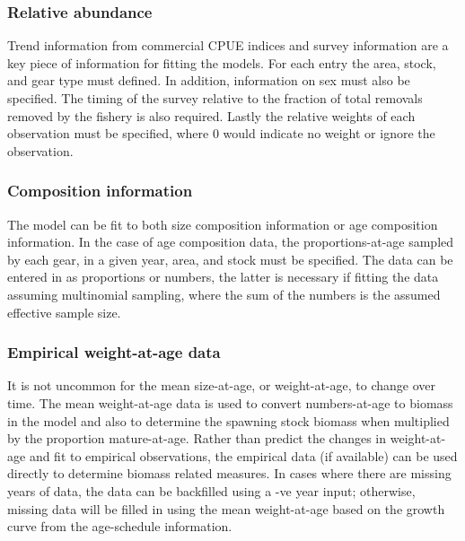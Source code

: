     \subsubsection{Relative abundance} %
    \label{ssub:relative_abundance}
        Trend information from commercial CPUE indices and survey information are a key piece of information for fitting the models.  For each entry the area, stock, and gear type must defined. In addition, information on sex must also be specified.  The timing of the survey relative to the fraction of total removals removed by the fishery is also required.  Lastly the relative weights of each observation must be specified, where 0 would indicate no weight or ignore the observation.
    \subsubsection{Composition information} %
    \label{ssub:composition_information}
        The model can be fit to both size composition information or age composition information.  In the case of age composition data, the proportions-at-age sampled by each gear, in a given year, area, and stock must be specified.  The data can be entered in as proportions or numbers, the latter is necessary if fitting the data assuming multinomial sampling, where the sum of the numbers is the assumed effective sample size.
    \subsubsection{Empirical weight-at-age data} %
    \label{ssub:empirical_weight_at_age_data}
        It is not uncommon for the mean size-at-age, or weight-at-age, to change over time.  The mean weight-at-age data is used to convert numbers-at-age to biomass in the model and also to determine the spawning stock biomass when multiplied by the proportion mature-at-age.  Rather than predict the changes in weight-at-age and fit to empirical observations, the empirical data (if available) can be used directly to determine biomass related measures.  In cases where there are missing years of data, the data can be backfilled using a -ve year input; otherwise, missing data will be filled in using the mean weight-at-age based on the growth curve from the age-schedule information.


